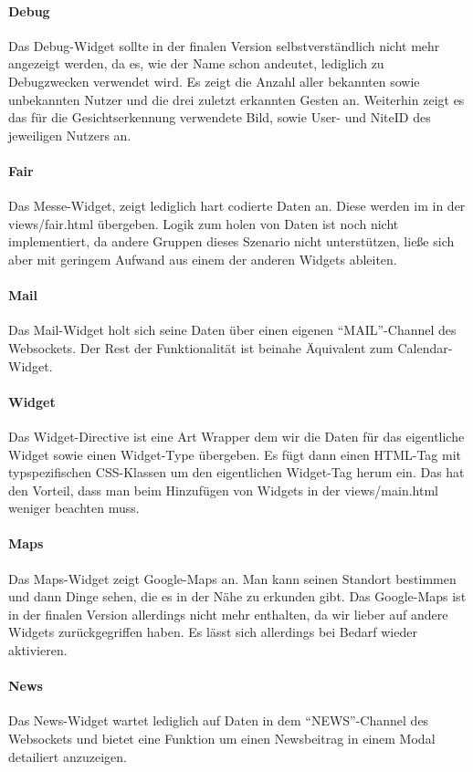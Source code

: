 \documentclass[10pt,a4paper]{report}
\newcommand{\code}[1]{{\fontfamily{cmvtt}\selectfont #1}}
\begin{document}
				\paragraph{Debug}
					Das Debug-Widget sollte in der finalen Version selbstverständlich nicht mehr angezeigt werden, da es, wie der Name schon andeutet, lediglich zu Debugzwecken verwendet wird. Es zeigt die Anzahl aller bekannten sowie unbekannten Nutzer und die drei zuletzt erkannten Gesten an. Weiterhin zeigt es das für die Gesichtserkennung verwendete Bild, sowie User- und NiteID des jeweiligen Nutzers an. 
				\paragraph{Fair}
					Das Messe-Widget, zeigt lediglich hart codierte Daten an. Diese werden im in der \code{views/fair.html} übergeben. Logik zum holen von Daten ist noch nicht implementiert, da andere Gruppen dieses Szenario nicht unterstützen, ließe sich aber mit geringem Aufwand aus einem der anderen Widgets ableiten. 
				\paragraph{Mail} 
					Das Mail-Widget holt sich seine Daten über einen eigenen "`MAIL"'-Channel des Websockets. Der Rest der Funktionalität ist beinahe Äquivalent zum Calendar-Widget.
				\paragraph{Widget}
					Das Widget-Directive ist eine Art Wrapper dem wir die Daten für das eigentliche Widget sowie einen Widget-Type übergeben. Es fügt dann einen HTML-Tag mit typspezifischen CSS-Klassen um den eigentlichen Widget-Tag herum ein. Das hat den Vorteil, dass man beim Hinzufügen von Widgets in der \code{views/main.html} weniger beachten muss.
				\paragraph{Maps}
					Das Maps-Widget zeigt Google-Maps an. Man kann seinen Standort bestimmen und dann Dinge sehen, die es in der Nähe zu erkunden gibt. Das Google-Maps ist in der finalen Version allerdings nicht mehr enthalten, da wir lieber auf andere Widgets zurückgegriffen haben. Es lässt sich allerdings bei Bedarf wieder aktivieren.
				\paragraph{News}
					Das News-Widget wartet lediglich auf Daten in dem "`NEWS"'-Channel des Websockets und bietet eine Funktion um einen Newsbeitrag in einem Modal detailiert anzuzeigen.
\end{document}
